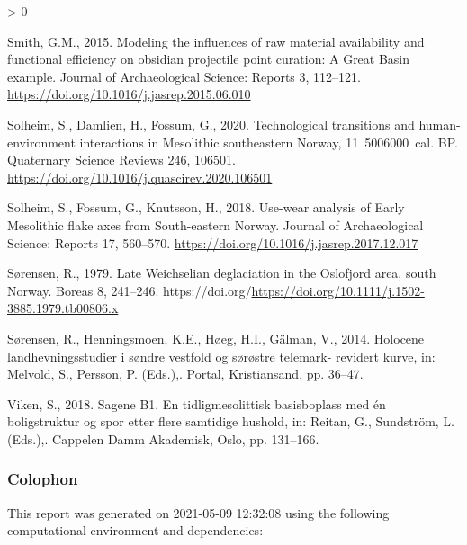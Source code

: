 \documentclass[
]{article}
\newlength{\cslhangindent}
\newenvironment{CSLReferences}[2] %
 {%
  \setlength{\parindent}{0pt}
  \ifodd #1 \everypar{\setlength{\hangindent}{\cslhangindent}}\ignorespaces\fi
  \ifnum #2 > 0
  \setlength{\parskip}{#2\baselineskip}
  \fi
 }%
 {}
\begin{document}
\begin{CSLReferences}{1}{0}
\leavevmode\hypertarget{ref-smith2015}{}%
Smith, G.M., 2015. Modeling the influences of raw material availability and functional efficiency on obsidian projectile point curation: A Great Basin example. Journal of Archaeological Science: Reports 3, 112--121. \url{https://doi.org/10.1016/j.jasrep.2015.06.010}

\leavevmode\hypertarget{ref-solheim2020}{}%
Solheim, S., Damlien, H., Fossum, G., 2020. Technological transitions and human-environment interactions in Mesolithic southeastern Norway, 11~500{{}}6000~cal. BP. Quaternary Science Reviews 246, 106501. \url{https://doi.org/10.1016/j.quascirev.2020.106501}

\leavevmode\hypertarget{ref-solheim2018}{}%
Solheim, S., Fossum, G., Knutsson, H., 2018. Use-wear analysis of Early Mesolithic flake axes from South-eastern Norway. Journal of Archaeological Science: Reports 17, 560--570. \url{https://doi.org/10.1016/j.jasrep.2017.12.017}

\leavevmode\hypertarget{ref-suxf8rensen1979}{}%
Sørensen, R., 1979. Late Weichselian deglaciation in the Oslofjord area, south Norway. Boreas 8, 241--246. https://doi.org/\url{https://doi.org/10.1111/j.1502-3885.1979.tb00806.x}

\leavevmode\hypertarget{ref-suxf8rensen2014}{}%
Sørensen, R., Henningsmoen, K.E., Høeg, H.I., Gälman, V., 2014. Holocene landhevningsstudier i søndre vestfold og sørøstre telemark- revidert kurve, in: Melvold, S., Persson, P. (Eds.),. Portal, Kristiansand, pp. 36--47.

\leavevmode\hypertarget{ref-viken2018}{}%
Viken, S., 2018. Sagene B1. En tidligmesolittisk basisboplass med én boligstruktur og spor etter flere samtidige hushold, in: Reitan, G., Sundström, L. (Eds.),. Cappelen Damm Akademisk, Oslo, pp. 131--166.

\end{CSLReferences}

\newpage

\hypertarget{colophon}{%
\subsubsection{Colophon}\label{colophon}}

This report was generated on 2021-05-09 12:32:08 using the following computational environment and dependencies:
\end{document}
